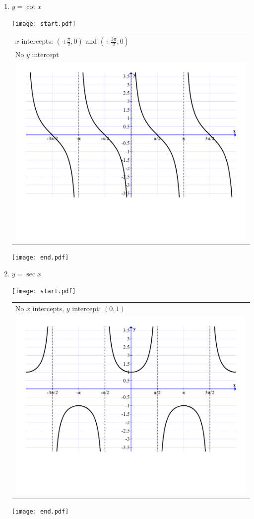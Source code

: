 \documentclass[12pt]{article}
\begin{document}
\begin{enumerate}
\begin{enumerate}
\item $\displaystyle y=\cot{x}$

\texttt{[image: start.pdf]}
{\begin{tabular}{l}
$x$ intercepts: $\displaystyle \left(\pm \frac{\pi}{2},0 \right)$ and $\displaystyle \left(\pm \frac{3\pi}{2},0 \right)$\\
No $y$ intercept\\
\includegraphics[scale=0.3]{cotangent.pdf}
\end{tabular}
}
\texttt{[image: end.pdf]}


\item $\displaystyle y=\sec{x}$

\texttt{[image: start.pdf]}
{\begin{tabular}{l}
No $x$ intercepts, $y$ intercept: $(0,1)$\\
\includegraphics[scale=0.3]{secant.pdf}
\end{tabular}
}
\texttt{[image: end.pdf]}



\end{enumerate}
\end{enumerate}
\end{document}
